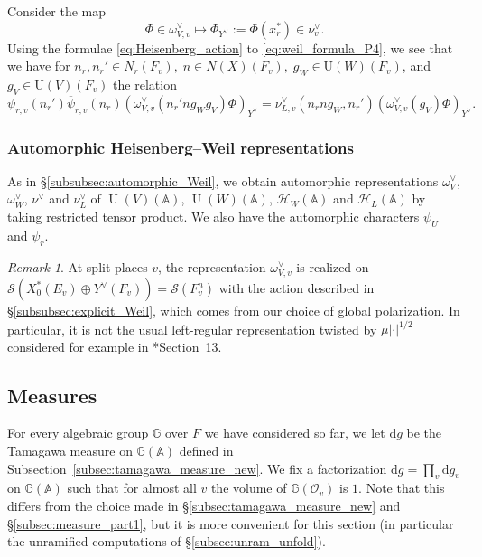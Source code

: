 \documentclass[letterpaper,11pt]{amsart}
\newcommand{\bA}{\mathbb{A}}
\newcommand{\bG}{\mathbb{G}}
\newcommand{\cH}{\mathcal{H}}
\newcommand{\cO}{\mathcal{O}}
\newcommand{\cS}{\mathcal{S}}
\newcommand{\rd}{\mathrm{d}}
\newcommand{\<}{\negthickspace}
\newcommand{\valP}[1]{\left|#1\right|}
\DeclareMathOperator{\U}{U}
\theoremstyle{definition}
\theoremstyle{plain}
\theoremstyle{remark}
\newtheorem{remark}[definition]{Remark}
\numberwithin{equation}{section}
\begin{document}
Consider the map
    \begin{equation}
        \label{eq:Phi_W_defi}
        \Phi \in \omega_{V,v}^\vee \mapsto \Phi_{Y^\vee} := \Phi(x_r^*) \in \nu_v^\vee.
    \end{equation}
    Using the formulae \eqref{eq:Heisenberg_action} to \eqref{eq:weil_formula_P4}, we see that we have for $n_r, n_r' \in N_r(F_v), \; n \in N(X)(F_v), \; g_W \in \mathrm{U}(W)(F_v)$, and $ g_V \in \mathrm{U}(V)(F_v)$ the relation 
    \begin{equation}
        \label{eq:nu_relation}
            \psi_{r,v}(n_r') \overline{\psi}_{r,v}(n_r) (\omega_{V,v}^\vee(n_r' ng_Wg_V) \Phi)_{Y^\vee}=\nu_{L,v}^\vee (n_rng_W,n_r')(\omega_{V,v}^\vee(g_V) \Phi)_{Y^\vee}.
        \end{equation}

\subsubsection{Automorphic Heisenberg--Weil representations} As in \S\ref{subsubsec:automorphic_Weil}, we obtain automorphic representations $\omega_V^\vee$, $\omega_W^\vee$, $\nu^\vee$ and $\nu_L^\vee$ of $\U(V)(\bA)$, $\U(W)(\bA)$, $\cH_W(\bA)$ and $\cH_L(\bA)$ by taking restricted tensor product. We also have the automorphic characters $\psi_U$ and $\psi_r$.

\begin{remark}
    At split places $v$, the representation $\omega^\vee_{V,v}$ is realized on $\cS(X_0^*(E_v) \oplus Y^\vee(F_v))=\cS(F_v^n)$ with the action described in \S\ref{subsubsec:explicit_Weil}, which comes from our choice of global polarization. In particular, it is not the usual left-regular representation twisted by $\mu \valP{\cdot}^{1/2}$ considered for example in \cite{GGP}*{Section~13}. 
\end{remark}

\subsection{Measures}
\label{subsec:final_measures}

For every algebraic group $\bG$ over $F$ we have considered so far, we let $\rd g$ be the Tamagawa measure on $\bG(\bA)$ defined in Subsection~\ref{subsec:tamagawa_measure_new}. We fix a factorization $\rd g = \prod_v \rd g_v$ on $\bG(\bA)$ such that for almost all $v$ the volume of $\bG(\cO_v)$ is $1$. Note that this differs from the choice made in \S\ref{subsec:tamagawa_measure_new} and \S\ref{subsec:measure_part1}, but it is more convenient for this section (in particular the unramified computations of \S\ref{subsec:unram_unfold}).
\end{document}
